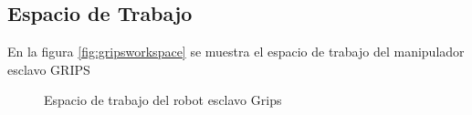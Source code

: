 \newpage
\subsection{Espacio de Trabajo}

En la figura \ref{fig:gripsworkspace} se muestra el espacio de trabajo del manipulador esclavo GRIPS


\begin{figure}[htb!]
\caption{Espacio de trabajo del robot esclavo Grips}
\label{fig:gripsworkspace}
\label{RobotGrips}
\end{figure}


